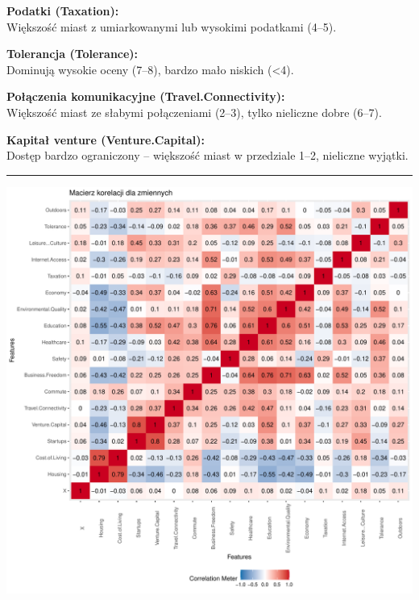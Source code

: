 \documentclass[
  12pt,
]{article}
\begin{document}
\textbf{Podatki (Taxation):}\\
Większość miast z umiarkowanymi lub wysokimi podatkami (4--5).

\textbf{Tolerancja (Tolerance):}\\
Dominują wysokie oceny (7--8), bardzo mało niskich (\textless4).

\textbf{Połączenia komunikacyjne (Travel.Connectivity):}\\
Większość miast ze słabymi połączeniami (2--3), tylko nieliczne dobre
(6--7).

\textbf{Kapitał venture (Venture.Capital):}\\
Dostęp bardzo ograniczony -- większość miast w przedziale 1--2,
nieliczne wyjątki.

\begin{center}\rule{0.5\linewidth}{0.5pt}\end{center}

\begin{center}\includegraphics{Sprawozdanie2_files/figure-latex/wykresy_korelacji-1} \end{center}
\end{document}

